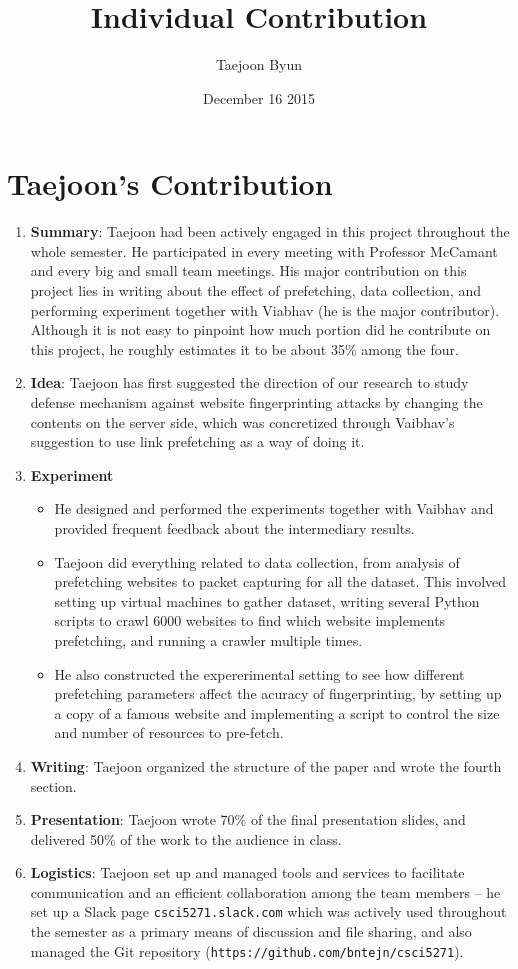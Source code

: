 \documentclass{article}
\title{Individual Contribution}
\author{Taejoon Byun}
\date{December 16 2015}
\begin{document}
\section{Taejoon's Contribution}
\begin{enumerate}
\item
{\bf Summary}:
Taejoon had been actively engaged in this project throughout the whole semester.
He participated in every meeting with Professor McCamant and every big and small team meetings.
His major contribution on this project lies in writing about the effect of prefetching, data collection, and performing experiment together with Viabhav (he is the major contributor).
Although it is not easy to pinpoint how much portion did he contribute on this project, he roughly estimates it to be about 35\% among the four.
\item
{\bf Idea}: Taejoon has first suggested the direction of our research to study defense mechanism against website fingerprinting attacks by changing the contents on the server side, which was concretized through Vaibhav's suggestion to use link prefetching as a way of doing it.
\item
{\bf Experiment}
\begin{itemize}
\item
He designed and performed the experiments together with Vaibhav and provided frequent feedback about the intermediary results.
\item
Taejoon did everything related to data collection, from analysis of prefetching websites to packet capturing for all the dataset.
This involved setting up virtual machines to gather dataset, writing several Python scripts to crawl 6000 websites to find which website implements prefetching, and running a crawler multiple times.
\item
He also constructed the expererimental setting to see how different prefetching parameters affect the acuracy of fingerprinting, by setting up a copy of a famous website and implementing a script to control the size and number of resources to pre-fetch.
\end{itemize}
\item
{\bf Writing}: Taejoon organized the structure of the paper and wrote the fourth section.
\item
{\bf Presentation}: Taejoon wrote 70\% of the final presentation slides, and delivered 50\% of the work to the audience in class.
\item
{\bf Logistics}: Taejoon set up and managed tools and services to facilitate communication and an efficient collaboration among the team members -- he set up a Slack page {\tt csci5271.slack.com} which was actively used throughout the semester as a primary means of discussion and file sharing, and also managed the Git repository ({\tt https://github.com/bntejn/csci5271}).

\end{enumerate}
\end{document}
